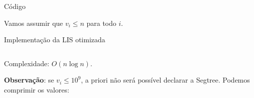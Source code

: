 \begin{frame}{Código}

    Vamos assumir que $v_i \leq n$ para todo $i$.
    \begin{block}{Implementação da LIS otimizada}
        \footnotesize
        \inputminted{cpp}{codigos/lis2.cpp}    
    \end{block}

    Complexidade: $O(n \log n)$.

    {\bf Observação}: se $v_i \leq 10^9$, a priori não será possível declarar a Segtree. Podemos comprimir os valores:
\end{frame}
